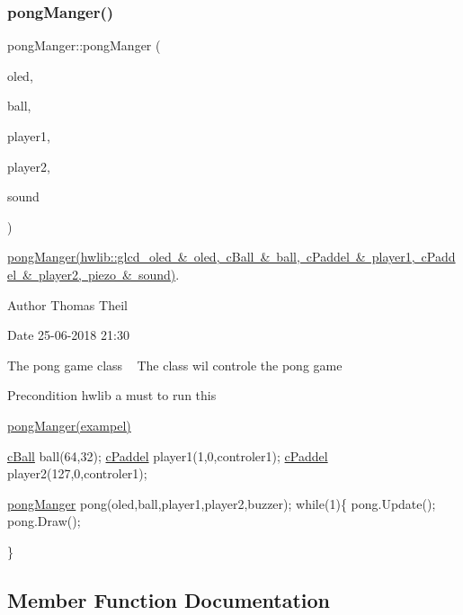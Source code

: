 \subsubsection{\texorpdfstring{pong\+Manger()}{pongManger()}}
{\footnotesize\ttfamily pong\+Manger\+::pong\+Manger (\begin{DoxyParamCaption}\item[{hwlib\+::glcd\+\_\+oled\+\_\+buffered \&}]{oled,  }\item[{\mbox{\hyperlink{classc_ball}{c\+Ball}} \&}]{ball,  }\item[{\mbox{\hyperlink{classc_paddel}{c\+Paddel}} \&}]{player1,  }\item[{\mbox{\hyperlink{classc_paddel}{c\+Paddel}} \&}]{player2,  }\item[{\mbox{\hyperlink{classpiezo}{piezo}} \&}]{sound }\end{DoxyParamCaption})}



\mbox{\hyperlink{classpong_manger}{pong\+Manger(hwlib\+::glcd\+\_\+oled  \& oled, c\+Ball \& ball, c\+Paddel \& player1, c\+Paddel \& player2, piezo \& sound)}}. 

\begin{DoxyAuthor}{Author}
Thomas Theil 
\end{DoxyAuthor}
\begin{DoxyDate}{Date}
25-\/06-\/2018 21\+:30
\end{DoxyDate}
The pong game class ~\newline
The class wil controle the pong game

\begin{DoxyPrecond}{Precondition}
hwlib a must to run this 
\end{DoxyPrecond}
\mbox{\hyperlink{classpong_manger}{pong\+Manger(exampel)}} 
\begin{DoxyCode}
\mbox{\hyperlink{classc_ball}{cBall}} ball(64,32);
\mbox{\hyperlink{classc_paddel}{cPaddel}} player1(1,0,controler1);
\mbox{\hyperlink{classc_paddel}{cPaddel}} player2(127,0,controler1);

\mbox{\hyperlink{classpong_manger}{pongManger}} pong(oled,ball,player1,player2,buzzer);
\textcolor{keywordflow}{while}(1)\{
    pong.Update();
    pong.Draw();

\}
\end{DoxyCode}
 

\subsection{Member Function Documentation}
\mbox{\label{classpong_manger_a177da6a9f5120dc153b8f33d8e6bebc3}} 
